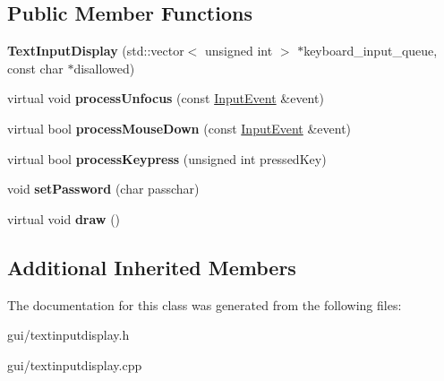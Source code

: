 \subsection*{Public Member Functions}
\begin{DoxyCompactItemize}
\item 
{\bfseries Text\+Input\+Display} (std\+::vector$<$ unsigned int $>$ $\ast$keyboard\+\_\+input\+\_\+queue, const char $\ast$disallowed)\hypertarget{classTextInputDisplay_a3a0a4701b2dbf5d1049da06d1a4e9731}{}\label{classTextInputDisplay_a3a0a4701b2dbf5d1049da06d1a4e9731}

\item 
virtual void {\bfseries process\+Unfocus} (const \hyperlink{structInputEvent}{Input\+Event} \&event)\hypertarget{classTextInputDisplay_a01bddf84372c06df165499d2dfdc7792}{}\label{classTextInputDisplay_a01bddf84372c06df165499d2dfdc7792}

\item 
virtual bool {\bfseries process\+Mouse\+Down} (const \hyperlink{structInputEvent}{Input\+Event} \&event)\hypertarget{classTextInputDisplay_a04be9ea9738064472a92b84f1cb5729d}{}\label{classTextInputDisplay_a04be9ea9738064472a92b84f1cb5729d}

\item 
virtual bool {\bfseries process\+Keypress} (unsigned int pressed\+Key)\hypertarget{classTextInputDisplay_a166c987ba3a70c6a107baab817fc46c6}{}\label{classTextInputDisplay_a166c987ba3a70c6a107baab817fc46c6}

\item 
void {\bfseries set\+Password} (char passchar)\hypertarget{classTextInputDisplay_a0449028256093b923e02849870310865}{}\label{classTextInputDisplay_a0449028256093b923e02849870310865}

\item 
virtual void {\bfseries draw} ()\hypertarget{classTextInputDisplay_ade83e7ddadb7a797ebfdc2ef84da2d1d}{}\label{classTextInputDisplay_ade83e7ddadb7a797ebfdc2ef84da2d1d}

\end{DoxyCompactItemize}
\subsection*{Additional Inherited Members}


The documentation for this class was generated from the following files\+:\begin{DoxyCompactItemize}
\item 
gui/textinputdisplay.\+h\item 
gui/textinputdisplay.\+cpp\end{DoxyCompactItemize}
